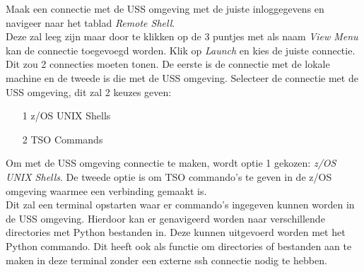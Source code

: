 Maak een connectie met de USS omgeving met de juiste inloggegevens en navigeer naar het tablad \textit{Remote Shell}. \\

Deze zal leeg zijn maar door te klikken op de 3 puntjes met als naam \textit{View Menu} kan de connectie toegevoegd worden. Klik op \textit{Launch} en kies de juiste connectie. Dit zou 2 connecties moeten tonen. De eerste is de connectie met de lokale machine en de tweede is die met de USS omgeving. Selecteer de connectie met de USS omgeving, dit zal 2 keuzes geven:

\begin{itemize}
    \item[1] z/OS UNIX Shells
    \item[2] TSO Commands
\end{itemize}

Om met de USS omgeving connectie te maken, wordt optie 1 gekozen: \textit{z/OS UNIX Shells}. De tweede optie is om TSO commando's te geven in de z/OS omgeving waarmee een verbinding gemaakt is. \\

Dit zal een terminal opstarten waar er commando's ingegeven kunnen worden in de USS omgeving. Hierdoor kan er genavigeerd worden naar verschillende directories met Python bestanden in. Deze kunnen uitgevoerd  worden met het Python commando. Dit heeft ook als functie om directories of bestanden aan te maken in deze terminal zonder een externe ssh connectie nodig te hebben. \\

